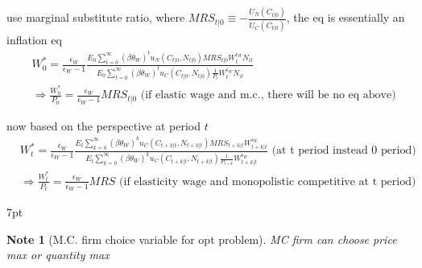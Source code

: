 \documentclass{article}
\newenvironment{blueblock}{
\def\FrameCommand{
  \hspace{1pt}
    {\color{DarkBlue}
    \vrule width 2pt}
    {\color{blueshade}
    \vrule width 4pt}
  \colorbox{blueshade}
}
\MakeFramed{
  \advance
  \hsize-
  \width
  \FrameRestore}
\noindent\hspace{-4.55pt}%
\begin{adjustwidth}{}{7pt}
\vspace{2pt}\vspace{2pt}
}
{\vspace{2pt}\end{adjustwidth}\endMakeFramed}
\newtheorem{note}{Note}
\begin{document}
use marginal substitute ratio, where $MRS_{t|0}\equiv -\frac{U_N(C_{t|0})}{U_C(C_{t|0})}$, the eq is essentially an inflation eq
\begin{align}
& W_0^*= \frac{\epsilon_W}{\epsilon_W-1}
\frac{
E_0 \sum\limits_{t=0}^{\infty} (\beta \theta_W)^t u_N(C_{t|0},N_{t|0})MRS_{t|0} W_t^{\epsilon_W}N_{it}
}{
E_0 \sum\limits_{t=0}^{\infty} (\beta \theta_W)^t u_C(C_{t|0},N_{t|0})\frac{1}{P_t} W_t^{\epsilon_W} N_{it}
}
\\& \Rightarrow \frac{W_0^*}{P_0}=\frac{\epsilon_W}{\epsilon_W-1}MRS_{t|0} \text{ (if elastic wage and m.c., there will be no eq above)}
\end{align}

now based on the perspective at period $t$
\begin{align}
& W_t^* = \frac{\epsilon_W}{\epsilon_W-1} 
\frac{E_t \sum\limits_{k=0}^{\infty}(\beta \theta_W)^k u_C(C_{t+k|t},N_{t+k|t})MRS_{t+k|t}W^{\epsilon_W}_{t+k|t}}{E_t \sum\limits_{k=0}^{\infty}(\beta \theta_W)^k u_C(C_{t+k|t},N_{t+k|t})\frac{1}{P_{t+k}}W^{\epsilon_W}_{t+k|t}}
\text{ (at t period instead 0 period)}
\\& \Rightarrow \frac{W_t^*}{P_t}=\frac{\epsilon_W}{\epsilon_W-1}MRS \text{ (if elasticity wage and monopolistic competitive at t period)}
\end{align}


\begin{blueblock}
\begin{note}[M.C. firm choice variable for opt problem]
MC firm can choose price max or quantity max
\end{note}
\end{blueblock}
\end{document}
